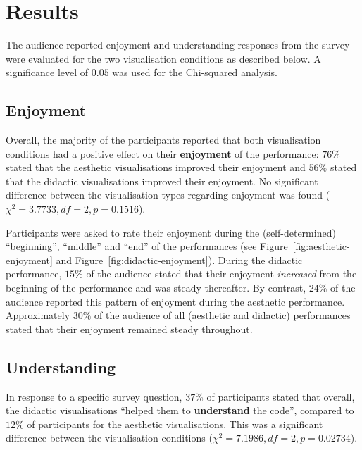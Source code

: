\section{Results}

The audience-reported enjoyment and understanding responses from the survey were evaluated for the two visualisation conditions as described below. A significance level of $0.05$ was used for the Chi-squared analysis.

\subsection{Enjoyment}



Overall, the majority of the participants reported that both visualisation conditions had a positive effect on their \textbf{enjoyment} of the performance: $76\%$ stated that the aesthetic visualisations improved their enjoyment and $56\%$ stated that the didactic visualisations improved their enjoyment. No significant difference between the visualisation types regarding  enjoyment was found ($\chi^2=3.7733,df=2,p=0.1516$).

Participants were asked to rate their enjoyment during the (self-determined) ``beginning'', ``middle'' and ``end'' of the performances (see Figure~\ref{fig:aesthetic-enjoyment} and Figure~\ref{fig:didactic-enjoyment}). During the didactic performance, $15\%$ of the audience stated that their enjoyment \emph{increased} from the beginning of the performance and was steady thereafter. By contrast, $24\%$ of the audience reported this pattern of enjoyment during the aesthetic performance. Approximately $30\%$ of the audience of all (aesthetic and didactic) performances stated that their enjoyment remained steady throughout.

\subsection{Understanding}



In response to a specific survey question, $37\%$ of participants stated that overall, the didactic visualisations ``helped them to \textbf{understand} the code'', compared to $12\%$ of participants for the aesthetic visualisations. This was a significant difference between the visualisation conditions ($\chi^2=7.1986,df=2,p=0.02734$).

